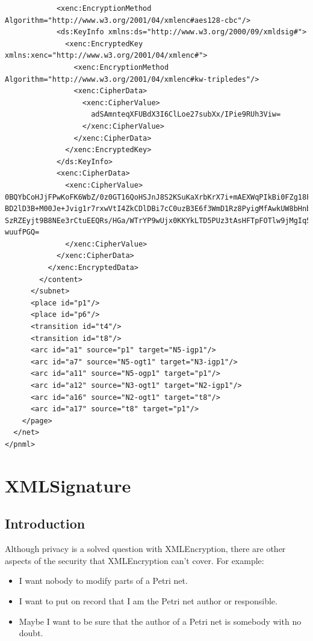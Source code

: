 \begin{lstlisting}
            <xenc:EncryptionMethod Algorithm="http://www.w3.org/2001/04/xmlenc#aes128-cbc"/>
            <ds:KeyInfo xmlns:ds="http://www.w3.org/2000/09/xmldsig#">
              <xenc:EncryptedKey xmlns:xenc="http://www.w3.org/2001/04/xmlenc#">
                <xenc:EncryptionMethod Algorithm="http://www.w3.org/2001/04/xmlenc#kw-tripledes"/>
                <xenc:CipherData>
                  <xenc:CipherValue>
                    adSAmnteqXFUBdX3I6ClLoe27subXx/IPie9RUh3Viw=
                  </xenc:CipherValue>
                </xenc:CipherData>
              </xenc:EncryptedKey>
            </ds:KeyInfo>
            <xenc:CipherData>
              <xenc:CipherValue>
0BQYbCoHJjFPwKoFK6WbZ/0z0GT16QoHSJnJ8S2KSuKaXrbKrX7i+mAEXWqPIkBi0FZg18FwHlba
BD2lD3B+M00Je+Jvig1r7rxwVtI4ZkCDlDBi7cC0uzB3E6f3WmD1Rz8PyigMfAwkUW8bHnblqU+R
SzRZEyjt9B8NEe3rCtuEEQRs/HGa/WTrYP9wUjx0KKYkLTD5PUz3tAsHFTpFOTlw9jMgIq5QC9eP
wuufPGQ=
              </xenc:CipherValue>
            </xenc:CipherData>
          </xenc:EncryptedData>
        </content>
      </subnet>
      <place id="p1"/>
      <place id="p6"/>
      <transition id="t4"/>
      <transition id="t8"/>
      <arc id="a1" source="p1" target="N5-igp1"/>
      <arc id="a7" source="N5-ogt1" target="N3-igp1"/>
      <arc id="a11" source="N5-ogp1" target="p1"/>
      <arc id="a12" source="N3-ogt1" target="N2-igp1"/>
      <arc id="a16" source="N2-ogt1" target="t8"/>
      <arc id="a17" source="t8" target="p1"/>
    </page>
  </net>
</pnml>
\end{lstlisting}


\section{XMLSignature}

\subsection{Introduction}
Although privacy is a solved question with XMLEncryption, there are other aspects of the security that XMLEncryption can't cover. For example:

\begin{itemize}
\item I want nobody to modify parts of a Petri net.
\item I want to put on record that I am the Petri net author or responsible.
\item Maybe I want to be sure that the author of a Petri net is somebody
with no doubt.
\end{itemize}

